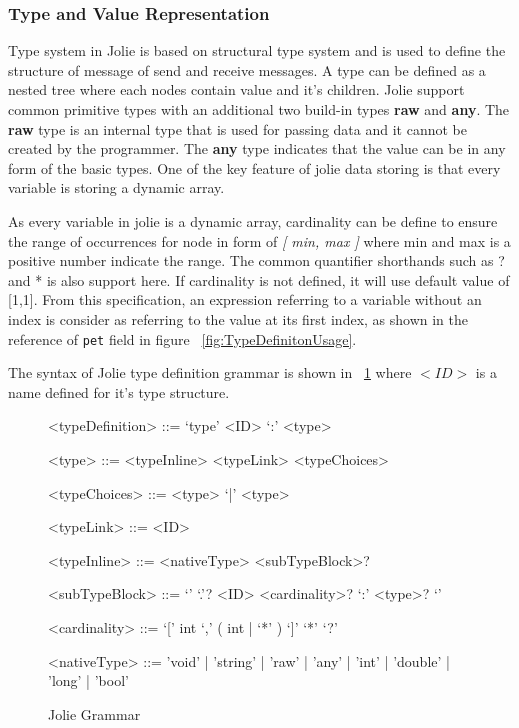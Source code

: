 \subsubsection{Type and Value Representation}

Type system in Jolie is based on structural type system and is used to define the structure of message of send and receive messages. A type can be defined as a nested tree where each nodes contain value and it's children. Jolie support common primitive types with an additional two build-in types \textbf{raw} and \textbf{any}. The \textbf{raw} type is an internal type that is used for passing data and it cannot be created by the programmer. The \textbf{any} type indicates that the value can be in any form of the basic types. One of the key feature of jolie data storing is that every variable is storing a dynamic array.

As every variable in jolie is a dynamic array, cardinality can be define to ensure the range of occurrences for node in form of \textit{[ min, max ]} where min and max is a positive number indicate the range. The common quantifier shorthands such as ? and * is also support here. If cardinality is not defined, it will use default value of [1,1]. From this specification, an expression referring to a variable without an index is consider as referring to the value at its first index, as shown in the reference of \texttt{pet} field in figure ~\ref{fig:TypeDefinitonUsage}. 

The syntax of Jolie type definition grammar is shown in ~\ref{fig:TypeDefinitonSyntax} where \(<ID>\) is a name defined for it's type structure.

\begin{figure}
	\begin{framed}
		\begin{grammar}
			<typeDefinition> ::= `type' <ID> `:' <type>

			<type> ::= <typeInline>
			\alt <typeLink>
			\alt <typeChoices>

			<typeChoices> ::= <type> `|' <type>

			<typeLink> ::= <ID>

			<typeInline> ::= <nativeType> <subTypeBlock>?

			<subTypeBlock> ::= `{' `.'? <ID> <cardinality>? `:' <type>? `}'

			<cardinality> ::= `[' int `,' ( int | `*' ) `]'
			\alt `*'
			\alt `?'

			<nativeType> ::= 'void' | 'string' | 'raw' | 'any' | 'int' | 'double' | 'long' | 'bool'
		\end{grammar}
	\end{framed}
	\caption{Jolie Grammar\protect\footnotemark}
	\label{fig:TypeDefinitonSyntax}
\end{figure}


